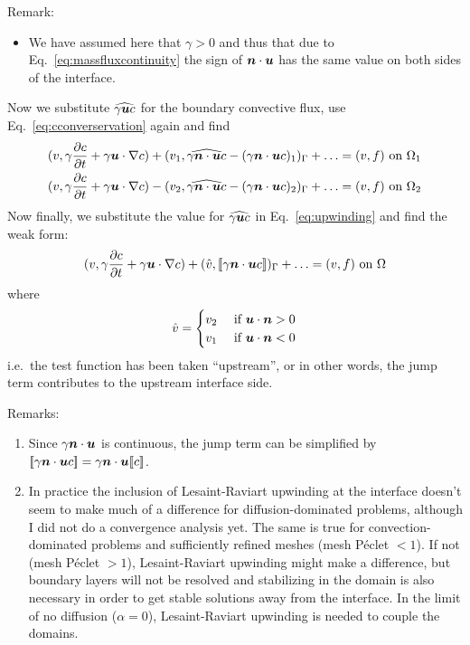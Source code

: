 Remark:
\begin{itemize}
   \item We have assumed here that $\gamma>0$ and thus that
         due to Eq.~\eqref{eq:massfluxcontinuity}
         the sign of $\boldsymbol{n}\cdot\boldsymbol{u}$ has the same value on both sides of
         the interface.
\end{itemize}
Now we substitute $\widehat{\gamma\boldsymbol{u} c}$ for the boundary convective flux, 
use Eq.~\eqref{eq:cconverservation} again and find
\begin{align}
   (v,\gamma\dfrac{\partial c}{\partial t} + \gamma\boldsymbol{u}\cdot\nabla c)+
              (v_1,\widehat{\gamma \boldsymbol{n}\cdot\boldsymbol{u} c}
              -(\gamma \boldsymbol{n}\cdot\boldsymbol{u} c)_1)_\Gamma+\ldots
              &=(v,f)\text{ on }\Omega_1\\
   (v,\gamma\dfrac{\partial c}{\partial t} + \gamma\boldsymbol{u}\cdot\nabla c)-
              (v_2,\widehat{\gamma \boldsymbol{n}\cdot\boldsymbol{u} c}
              -(\gamma\boldsymbol{n}\cdot \boldsymbol{u} c)_2)_\Gamma+\ldots
              &=(v,f)\text{ on }\Omega_2
\end{align}
Now finally, we substitute the value for $\widehat{\gamma\boldsymbol{u} c}$ in
Eq.~\eqref{eq:upwinding} and find the weak form:
\begin{equation}
   (v,\gamma\dfrac{\partial c}{\partial t} + \gamma\boldsymbol{u}\cdot\nabla c)+
              (\hat v,\text{[\![}\gamma \boldsymbol{n}\cdot\boldsymbol{u} c\text{]\!]})_\Gamma
              +\ldots
              =(v,f)\text{ on }\Omega
   \label{eq:weakconvectionupwinding}
\end{equation}
where
\begin{equation}
   \hat v=
\begin{cases}
v_2&\text{ if }\boldsymbol{u}\cdot\boldsymbol{n}>0\\
v_1&\text{ if }\boldsymbol{u}\cdot\boldsymbol{n}<0
\end{cases}
\label{eq:testfunctionupwinding}
\end{equation}
i.e.\ the test function has been taken ``upstream'', or in other words, the
jump term contributes to the upstream interface side.

Remarks:
\begin{enumerate}
\item Since $\gamma\boldsymbol{n}\cdot\boldsymbol{u}$ is continuous, the jump term can be
simplified by $\text{[\![}\gamma \boldsymbol{n}\cdot\boldsymbol{u} c\text{]\!]}=\gamma \boldsymbol{n}\cdot\boldsymbol{u}\text{[\![}
c\text{]\!]}$.
\item In practice the inclusion of Lesaint-Raviart upwinding at the interface
doesn't seem to make much of a difference for diffusion-dominated problems,
although I did not do a convergence analysis yet.
The same is
true for convection-dominated problems and sufficiently refined meshes (mesh
P\'eclet $<1$). If not (mesh P\'eclet $>1$), Lesaint-Raviart upwinding might
make a difference, but boundary layers will not be resolved and stabilizing in
the domain is also necessary in order to get stable solutions away from the
interface. In the limit of no diffusion ($\alpha=0$), Lesaint-Raviart upwinding
is needed to couple the domains.
\end{enumerate}


